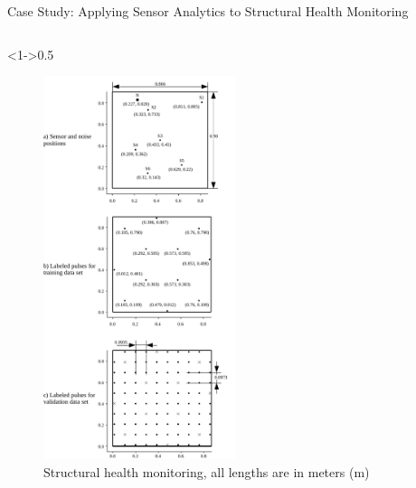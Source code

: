 \begin{frame}{Case Study: Applying Sensor Analytics to Structural Health Monitoring}
	\begin{columns}[c] %
		
		\begin{column}<1->{0.5\textwidth}\centering
			\begin{figure}
				\includegraphics[width=0.5\textwidth]{../chapters/cnn_accelerator/figures/histograms/data_set.pdf} %
				\caption{ Structural health monitoring, all lengths are in meters (m)}
			\end{figure}
		\end{column}
		

\end{columns}
\end{frame}
